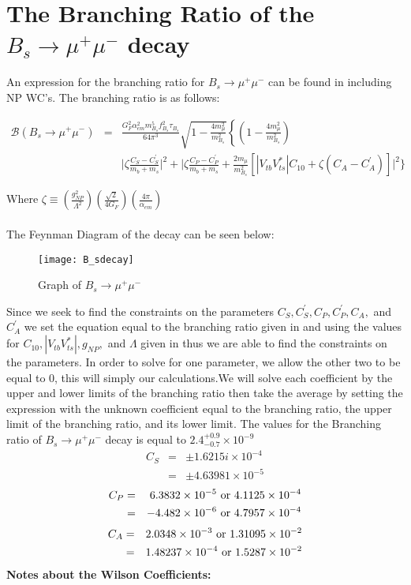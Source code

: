 \documentclass[12pt]{article}
\def \bea{\begin{eqnarray}}
\def \eea{\end{eqnarray}}
\def \({\left(}
\def \){\right)}
\def \lb{\left\{}
\def \nn{\nonumber}
\def \nl{\nn \\}
\def \al{\alpha}
\begin{document}
\section{The Branching Ratio of the $B_s \rightarrow \mu^+\mu^-$ decay}
An expression for the branching ratio for  $B_s \rightarrow \mu^+\mu^-$ can be found in \cite{Dighe:2012df} including NP WC's. The branching ratio is as follows:
\begin{center}
\bea
\mathcal{B}(B_s\rightarrow \mu^+\mu^-) &=& \frac{G_F^2 \al_{em}^2 m_{B_s}^5 f_{B_s}^2 \tau_{B_s}}{64\pi^3}\sqrt{1-\frac{4m_\mu^2}{m_{B_s}^2}} \lb\(1-\frac{4m_\mu^2}{m_{B_s}^2}\) \right. \nl 
&& \bigg|\zeta\frac{C_S-C_S^{'}}{m_b+m_s}\bigg|^2+\bigg|\zeta\frac{C_P-C_P^{'}}{m_b+m_s}+\frac{2m_\mu}{m_{B_s}^2}[|V_{tb} V_{ts}^*|C_{10}+\zeta (C_A-C_A^{'})]\bigg|^2\bigg\}
\eea
\end{center}
Where $\zeta \equiv (\frac{g_{NP}^2}{\Lambda^2})(\frac{\sqrt{2}}{4G_F})(\frac{4\pi}{\alpha_{em}})$\\
\\
The Feynman Diagram of the decay can be seen below: 
\begin{figure}[h]
\centering
\texttt{[image: B\_sdecay]}
\caption{Graph of $B_s \rightarrow \mu^+ \mu^-$}
\end{figure}
Since we seek to find the constraints on the parameters $C_S, C_S^{'},C_P, C_P^{'},C_A,$ and $C_A^{'}$ we set the equation equal to the branching ratio given in \cite{flavio} and using the values for $C_{10},|V_{tb} V_{ts}^*|, g_{NP},$ and $\Lambda$ given in \cite{Dighe:2012df} thus we are able to find the constraints on the parameters. In order to solve for one parameter, we allow the other two to be equal to 0, this will simply our calculations.We will solve each coefficient by the upper and lower limits of the branching ratio then take the average by setting the expression with the unknown coefficient equal to the branching ratio, the upper limit of the branching ratio, and its lower limit. 
The values for the Branching ratio of $B_s\rightarrow \mu^+\mu^- $ decay is equal to $2.4_{-0.7}^{+0.9} \times 10^{-9}$ \cite{Agashe:2014kda}
\bea
C_S&=& \pm 1.6215i \times 10^{-4} \nl
&=& \pm 4.63981\times 10^{-5}\nn
\eea
\bea
C_P&=& 6.3832 \times 10^{-5}~ {\rm or}~ 4.1125\times 10^{-4}\nl
&=&-4.482\times 10^{-6}~ {\rm or}~ 4.7957\times 10^{-4}\nn
\eea
\bea
C_A&=& 2.0348\times 10^{-3}~ {\rm or}~ 1.31095\times 10^{-2}\nl
&=& 1.48237\times 10^{-4} ~ {\rm or}~ 1.5287\times 10^{-2}\nn
\eea
\textbf{Notes about the Wilson Coefficients:}\\
\end{document}
